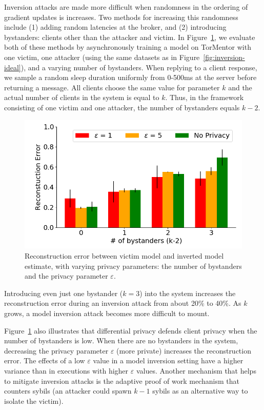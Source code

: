 Inversion attacks are made more difficult when randomness in the
ordering of gradient updates is increases. Two methods for increasing
this randomness include (1) adding random latencies at the broker, and 
(2) introducing bystanders: clients other than the attacker and victim.
In Figure~\ref{fig:inversion-bystander}, we evaluate both of these
methods by asynchronously training a model on TorMentor with one
victim, one attacker (using the same datasets as in 
Figure~\ref{fig:inversion-ideal}), and a varying number of bystanders.
When replying to a client response, we sample a random sleep duration
uniformly from 0-500ms at the server before returning a message.
All clients choose the same value for parameter $k$ and the actual
number of clients in the system is equal to $k$. Thus, in the framework
consisting of one victim and one attacker, the number of bystanders
equals $k-2$. 

\begin{figure}[t]
	\includegraphics[width=\linewidth]{fig/inversion-bystander}
	\caption{Reconstruction error between victim model and inverted
	model estimate, with varying privacy parameters: the number of
	bystanders and the privacy parameter $\varepsilon$.
          }
	\label{fig:inversion-bystander}
\end{figure}

Introducing even just one bystander ($k=3$) into the system increases
the reconstruction error during an inversion attack from about 20\% to
40\%. As $k$ grows, a model inversion attack becomes more difficult to
mount.

Figure~\ref{fig:inversion-bystander} also illustrates that differential
privacy defends client privacy when the number of bystanders is low.
When there are no bystanders in the system, decreasing the privacy
parameter $\varepsilon$ (more private) increases the reconstruction
error. The effects of a low $\varepsilon$ value in a model inversion
setting have a higher variance than in executions with higher
$\varepsilon$ values. Another mechanism that helps to mitigate
inversion attacks is the adaptive proof of work mechanism that counters
sybils (an attacker could spawn $k-1$ sybils as an alternative way to
isolate the victim).


